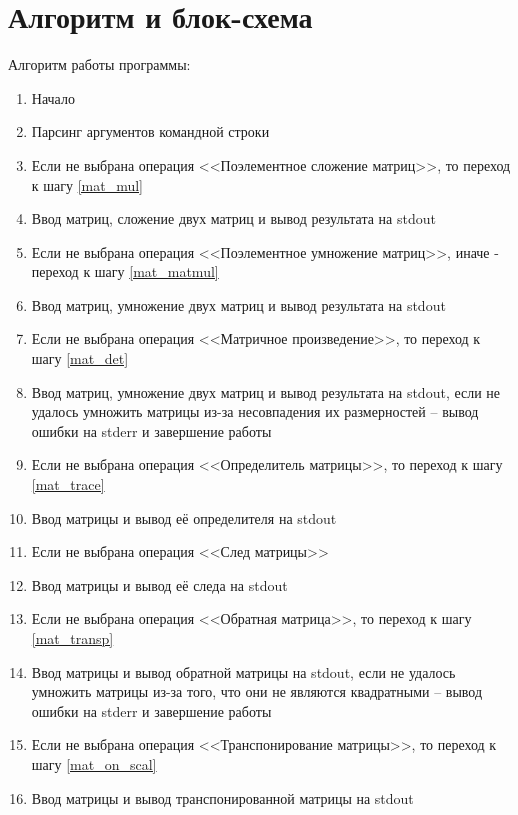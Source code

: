 \documentclass[a4paper,14pt]{extarticle}
\begin{document}
\section{Алгоритм и блок-схема}
Алгоритм работы программы:
\begin{enumerate}
\item Начало
\item Парсинг аргументов командной строки
	
\item Если не выбрана операция <<Поэлементное сложение матриц>>, то переход к шагу \ref{mat_mul}
\item Ввод матриц, сложение двух матриц и вывод результата на stdout
	
\item \label{mat_mul} 
Если не выбрана операция <<Поэлементное умножение матриц>>, 
иначе - переход к шагу \ref{mat_matmul}
\item Ввод матриц, умножение двух матриц и вывод результата на stdout
	
\item \label{mat_matmul} 
Если не выбрана операция <<Матричное произведение>>, то переход к шагу \ref{mat_det} 
\item Ввод матриц, умножение двух матриц и вывод результата на stdout, 
если не удалось умножить матрицы 
из-за несовпадения их размерностей -- вывод ошибки на stderr и завершение работы
	
\item \label{mat_det} 
Если не выбрана операция <<Определитель матрицы>>, то переход к шагу \ref{mat_trace}
\item Ввод матрицы и вывод её определителя на stdout
	
\item \label{mat_trace} Если не выбрана операция <<След матрицы>> 
\item Ввод матрицы и вывод её следа на stdout
	
\item \label{mat_reverse} 
Если не выбрана операция <<Обратная матрица>>, то переход к шагу \ref{mat_transp}	
\item Ввод матрицы и вывод обратной матрицы на stdout, 
если не удалось умножить матрицы из-за того, что они не являются
квадратными -- вывод ошибки на stderr и завершение работы
	
\item \label{mat_transp} 
Если не выбрана операция <<Транспонирование матрицы>>, то переход к шагу \ref{mat_on_scal}
\item Ввод матрицы и вывод транспонированной матрицы на stdout	
	

\end{enumerate}
\end{document}
